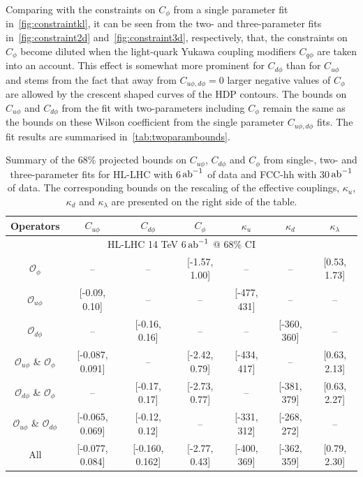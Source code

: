 Comparing with the constraints on $C_\phi$ from a single parameter fit in~\autoref{fig:constraintkl}, it can be seen from the two- and three-parameter fits in~\autoref{fig:constraint2d} and~\autoref{fig:constraint3d}, respectively,  that, the constraints on $C_\phi$ become diluted when the light-quark Yukawa coupling modifiers $C_{q\phi}$ are taken into an account. This effect is somewhat more prominent for $C_{d\phi}$ than for $C_{u\phi}$ and stems from the fact that away from $C_{u\phi,d\phi} = 0$ larger negative values of $C_\phi$ are allowed by the crescent shaped curves of the HDP contours. The bounds on $C_{u\phi}$ and $C_{d\phi}$ from the fit with two-parameters including $C_\phi$ remain the same as the bounds on these Wilson coefficient from the single parameter $C_{u\phi,d\phi}$ fits.  The fit results are summarised in~\autoref{tab:twoparambounds}. 
\begin{table}[]
	\centering
	{\footnotesize
		\begin{tabular}{cccc||ccc}
			\toprule
			Operators &  $C_{u\phi}$&   $C_{d\phi}$&   $C_{\phi}$&    $\kappa_{u}$&   $\kappa_{d}$&   $\kappa_\lambda$\\
			\midrule
			\multicolumn{7}{c}{HL-LHC 14 TeV 6$\,{\rm ab}^{-1}$ @ 68\% CI}\\
			\midrule
			$\mathcal O_{\phi}$ &--   & --            &[-1.57, 1.00] &--  & -- &[0.53, 1.73]\\
			$\mathcal O_{u\phi}$&[-0.09, 0.10]   & --            &-- &[-477, 431]  & -- &--\\
			$\mathcal O_{d\phi}$&--   & [-0.16, 0.16]            &-- &--  & [-360, 360] &--\\
			$\mathcal O_{u\phi}$ \& $\mathcal O_{\phi}$ &[-0.087, 0.091]  & --            &[-2.42, 0.79] &[-434, 417] & -- &[0.63, 2.13]\\
			$\mathcal O_{d\phi}$ \& $\mathcal O_{\phi}$ & --             &[-0.17, 0.17]  &[-2.73, 0.77]& -- &[-381, 379] &[0.63, 2.27]\\
			$\mathcal O_{u\phi}$ \& $\mathcal O_{d\phi}$&[-0.065, 0.069]&[-0.12, 0.12]& --            &[-331, 312] &[-268, 272] & -- \\
			All                                   &[-0.077, 0.084]&[-0.160, 0.162]& [-2.77, 0.43]&[-400, 369] &[-362, 359] & [0.79, 2.30] \\
			\bottomrule
		\end{tabular}
	}
	\caption{Summary of the 68\% projected bounds on $C_{u\phi}$, $C_{d\phi}$ and $C_\phi$ from single-, two- and three-parameter fits for HL-LHC with 6$\,{\rm ab}^{-1}$ of data and FCC-hh with 30$\,{\rm ab}^{-1}$ of data. The corresponding bounds on the rescaling of the effective couplings, $\kappa_u$, $\kappa_d$ and $\kappa_\lambda$ are presented on the right side of the table.}
	\label{tab:twoparambounds}
\end{table}
